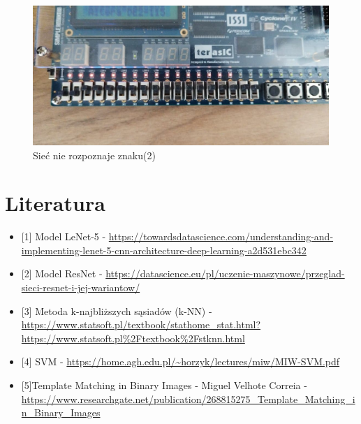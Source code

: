 \documentclass[a4paper, titleauthor]{mwart}
\begin{document}
\begin{figure}[h!]
    \centering
    \includegraphics[width = \textwidth, height = 0.6\textwidth]{nic2.jpg}
    \caption{Sieć nie rozpoznaje znaku(2)}
    \label{fig:enter-label}
\end{figure}

\section{\Large{Literatura}}
\begin{itemize}
    \item \label{1}[1] Model LeNet-5 - \url{https://towardsdatascience.com/understanding-and-implementing-lenet-5-cnn-architecture-deep-learning-a2d531ebc342}
    \item \label{2}[2] Model ResNet - \url{https://datascience.eu/pl/uczenie-maszynowe/przeglad-sieci-resnet-i-jej-wariantow/}
    \item \label{3}[3] Metoda k-najbliższych sąsiadów (k-NN) - \url{https://www.statsoft.pl/textbook/stathome_stat.html?https://www.statsoft.pl%2Ftextbook%2Fstknn.html}
    \item \label{4}[4] SVM - \url{https://home.agh.edu.pl/~horzyk/lectures/miw/MIW-SVM.pdf}
    \item \label{5}[5]Template Matching in Binary Images - Miguel Velhote Correia - \url{https://www.researchgate.net/publication/268815275_Template_Matching_in_Binary_Images}
\end{itemize}
\end{document}
